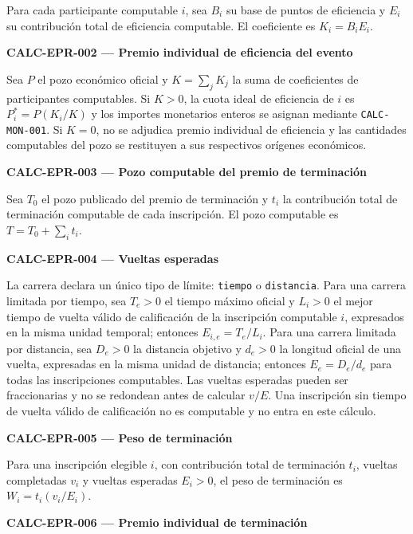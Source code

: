 \documentclass[10pt,letterpaper]{article}
\begin{document}
Para cada participante computable $i$, sea $B_i$ su base de puntos de eficiencia y $E_i$ su contribución total de eficiencia computable. El coeficiente es $K_i=B_i E_i$.\par\vspace{0.5em}
\noindent\textbf{CALC-EPR-002 --- Premio individual de eficiencia del evento}\par
Sea $P$ el pozo económico oficial y $K=\sum_j K_j$ la suma de coeficientes de participantes computables. Si $K>0$, la cuota ideal de eficiencia de $i$ es $P_i^*=P(K_i/K)$ y los importes monetarios enteros se asignan mediante \texttt{CALC-MON-001}. Si $K=0$, no se adjudica premio individual de eficiencia y las cantidades computables del pozo se restituyen a sus respectivos orígenes económicos.\par\vspace{0.5em}
\noindent\textbf{CALC-EPR-003 --- Pozo computable del premio de terminación}\par
Sea $T_0$ el pozo publicado del premio de terminación y $t_i$ la contribución total de terminación computable de cada inscripción. El pozo computable es $T=T_0+\sum_i t_i$.\par\vspace{0.5em}
\noindent\textbf{CALC-EPR-004 --- Vueltas esperadas}\par
La carrera declara un único tipo de límite: \texttt{tiempo} o \texttt{distancia}. Para una carrera limitada por tiempo, sea $T_e>0$ el tiempo máximo oficial y $L_i>0$ el mejor tiempo de vuelta válido de calificación de la inscripción computable $i$, expresados en la misma unidad temporal; entonces $E_{i,e}=T_e/L_i$. Para una carrera limitada por distancia, sea $D_e>0$ la distancia objetivo y $d_e>0$ la longitud oficial de una vuelta, expresadas en la misma unidad de distancia; entonces $E_e=D_e/d_e$ para todas las inscripciones computables. Las vueltas esperadas pueden ser fraccionarias y no se redondean antes de calcular $v/E$. Una inscripción sin tiempo de vuelta válido de calificación no es computable y no entra en este cálculo.\par\vspace{0.5em}
\noindent\textbf{CALC-EPR-005 --- Peso de terminación}\par
Para una inscripción elegible $i$, con contribución total de terminación $t_i$, vueltas completadas $v_i$ y vueltas esperadas $E_i>0$, el peso de terminación es $W_i=t_i(v_i/E_i)$.\par\vspace{0.5em}
\noindent\textbf{CALC-EPR-006 --- Premio individual de terminación}\par
\end{document}

